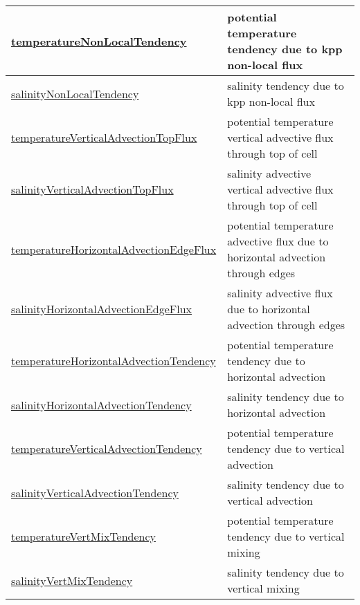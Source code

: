 {\begin{center}
\begin{longtable}{| p{2.0in} | p{4.0in} |}
    \hline
    \hyperref[subsec:var_sec_diagnostics_temperatureNonLocalTendency]{temperatureNonLocalTendency} & potential temperature tendency due to kpp non-local flux \\
    \hline
    \hyperref[subsec:var_sec_diagnostics_salinityNonLocalTendency]{salinityNonLocalTendency} & salinity tendency due to kpp non-local flux \\
    \hline
    \hyperref[subsec:var_sec_diagnostics_temperatureVerticalAdvectionTopFlux]{temperatureVerticalAdvection\-TopFlux} & potential temperature vertical advective flux through top of cell \\
    \hline
    \hyperref[subsec:var_sec_diagnostics_salinityVerticalAdvectionTopFlux]{salinityVerticalAdvectionTop\-Flux} & salinity advective vertical advective flux through top of cell \\
    \hline
    \hyperref[subsec:var_sec_diagnostics_temperatureHorizontalAdvectionEdgeFlux]{temperatureHorizontalAdvection\-EdgeFlux} & potential temperature advective flux due to horizontal advection through edges \\
    \hline
    \hyperref[subsec:var_sec_diagnostics_salinityHorizontalAdvectionEdgeFlux]{salinityHorizontalAdvectionEdge\-Flux} & salinity advective flux due to horizontal advection through edges \\
    \hline
    \hyperref[subsec:var_sec_diagnostics_temperatureHorizontalAdvectionTendency]{temperatureHorizontalAdvection\-Tendency} & potential temperature tendency due to horizontal advection \\
    \hline
    \hyperref[subsec:var_sec_diagnostics_salinityHorizontalAdvectionTendency]{salinityHorizontalAdvection\-Tendency} & salinity tendency due to horizontal advection \\
    \hline
    \hyperref[subsec:var_sec_diagnostics_temperatureVerticalAdvectionTendency]{temperatureVerticalAdvection\-Tendency} & potential temperature tendency due to vertical advection \\
    \hline
    \hyperref[subsec:var_sec_diagnostics_salinityVerticalAdvectionTendency]{salinityVerticalAdvection\-Tendency} & salinity tendency due to vertical advection \\
    \hline
    \hyperref[subsec:var_sec_diagnostics_temperatureVertMixTendency]{temperatureVertMixTendency} & potential temperature tendency due to vertical mixing \\
    \hline
    \hyperref[subsec:var_sec_diagnostics_salinityVertMixTendency]{salinityVertMixTendency} & salinity tendency due to vertical mixing \\

\end{longtable}
\end{center}}
